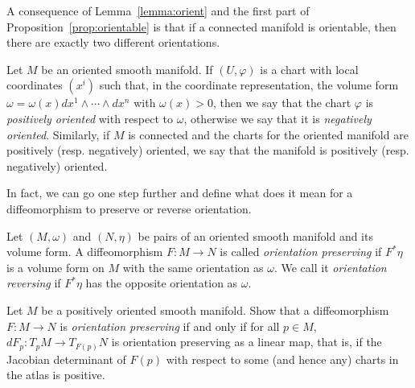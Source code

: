 A consequence of Lemma~\ref{lemma:orient} and the first part of Proposition~\ref{prop:orientable} is that if a connected manifold is orientable, then there are exactly two different orientations.

\begin{definition}
  Let $M$ be an oriented smooth manifold.
  If $(U,\varphi)$ is a chart with local coordinates $(x^i)$ such that, in the coordinate representation, the volume form $\omega = \omega(x) dx^1\wedge\cdots\wedge dx^n$ with $\omega(x) > 0$, then we say that the chart $\varphi$ is \emph{positively oriented} with respect to $\omega$, otherwise we say that it is \emph{negatively oriented}.
  Similarly, if $M$ is connected and the charts for the oriented manifold are positively (resp. negatively) oriented, we say that the manifold is positively (resp. negatively) oriented.
\end{definition}

In fact, we can go one step further and define what does it mean for a diffeomorphism to preserve or reverse orientation.

\begin{definition}
  Let $(M, \omega)$ and $(N, \eta)$ be pairs of an oriented smooth manifold and its volume form.
  A diffeomorphism $F: M \to N$ is called \emph{orientation preserving} if $F^* \eta$ is a volume form on $M$ with the same orientation as $\omega$.
  We call it \emph{orientation reversing} if $F^*\eta$ has the opposite orientation as $\omega$.
\end{definition}

\begin{exercise}
  Let $M$ be a positively oriented smooth manifold.
  Show that a diffeomorphism $F: M \to N$ is \emph{orientation preserving} if and only if for all $p\in M$, $dF_p : T_p M \to T_{F(p)} N$ is orientation preserving as a linear map, that is, if the Jacobian determinant of $F(p)$ with respect to some (and hence any) charts in the atlas is positive.
\end{exercise}

